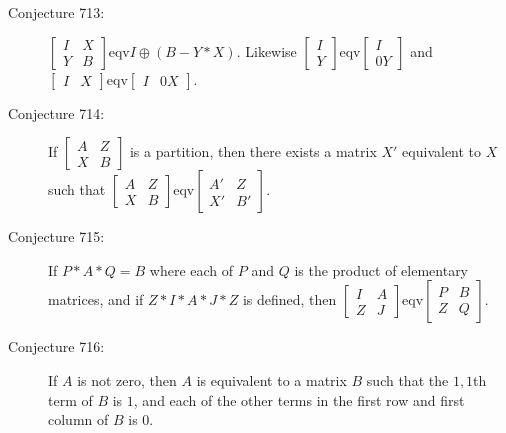 \documentclass{article}
\begin{document}
\begin{description}
  \item[Conjecture 713:] $ 
    \begin{bmatrix}
      I & X \\ 
      Y & B
    \end{bmatrix} 
    \text{eqv} I \oplus (B-Y*X)$. 
    Likewise $ 
    \begin{bmatrix}
      I \\ 
      Y
    \end{bmatrix} 
    \text{eqv} 
    \begin{bmatrix}
      I \\ 
      0Y
    \end{bmatrix} 
    $ and $
    \begin{bmatrix}
      I & X
    \end{bmatrix} 
    \text{eqv} 
    \begin{bmatrix}
      I & 0X
    \end{bmatrix} 
    $.

  \item[Conjecture 714:] If $ 
    \begin{bmatrix}
      A & Z \\ 
      X & B
    \end{bmatrix} 
    $ is a partition, then there exists a matrix $X'$ equivalent to $X$ such that $ 
    \begin{bmatrix}
      A & Z \\ 
      X & B
    \end{bmatrix} 
    \text{eqv} 
    \begin{bmatrix}
      A' & Z \\ 
      X' & B'
    \end{bmatrix}
    $.

  \item[Conjecture 715:] If $P*A*Q=B$ where each of $P$ and $Q$ is the product of elementary matrices, and if $Z*I*A*J*Z$ is defined, then $ 
    \begin{bmatrix}
      I & A \\ 
      Z & J
    \end{bmatrix} 
    \text{eqv} 
    \begin{bmatrix}
      P & B \\ 
      Z & Q
    \end{bmatrix}
    $.

  \item[Conjecture 716:] If $A$ is not zero, then $A$ is equivalent to a matrix $B$ such that the $1,1$th term of $B$ is $1$, and each of the other terms in the first row and first column of $B$ is $0$.

\end{description}
\end{document}
